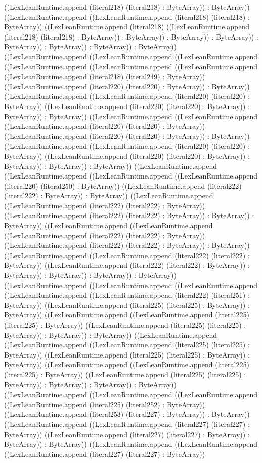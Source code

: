 \documentclass[11pt]{article}
\begin{document}
((LexLeanRuntime.append (literal218) (literal218) : ByteArray)) : ByteArray)) ((LexLeanRuntime.append ((LexLeanRuntime.append (literal218) (literal218) : ByteArray)) ((LexLeanRuntime.append (literal218) ((LexLeanRuntime.append (literal218) (literal218) : ByteArray)) : ByteArray)) : ByteArray)) : ByteArray)) : ByteArray)) : ByteArray)) : ByteArray)) : ByteArray)) ((LexLeanRuntime.append ((LexLeanRuntime.append ((LexLeanRuntime.append ((LexLeanRuntime.append ((LexLeanRuntime.append ((LexLeanRuntime.append ((LexLeanRuntime.append (literal218) (literal249) : ByteArray)) ((LexLeanRuntime.append (literal220) (literal220) : ByteArray)) : ByteArray)) ((LexLeanRuntime.append ((LexLeanRuntime.append (literal220) (literal220) : ByteArray)) ((LexLeanRuntime.append (literal220) (literal220) : ByteArray)) : ByteArray)) : ByteArray)) ((LexLeanRuntime.append ((LexLeanRuntime.append ((LexLeanRuntime.append (literal220) (literal220) : ByteArray)) ((LexLeanRuntime.append (literal220) (literal220) : ByteArray)) : ByteArray)) ((LexLeanRuntime.append ((LexLeanRuntime.append (literal220) (literal220) : ByteArray)) ((LexLeanRuntime.append (literal220) (literal220) : ByteArray)) : ByteArray)) : ByteArray)) : ByteArray)) ((LexLeanRuntime.append ((LexLeanRuntime.append ((LexLeanRuntime.append ((LexLeanRuntime.append (literal220) (literal250) : ByteArray)) ((LexLeanRuntime.append (literal222) (literal222) : ByteArray)) : ByteArray)) ((LexLeanRuntime.append ((LexLeanRuntime.append (literal222) (literal222) : ByteArray)) ((LexLeanRuntime.append (literal222) (literal222) : ByteArray)) : ByteArray)) : ByteArray)) ((LexLeanRuntime.append ((LexLeanRuntime.append ((LexLeanRuntime.append (literal222) (literal222) : ByteArray)) ((LexLeanRuntime.append (literal222) (literal222) : ByteArray)) : ByteArray)) ((LexLeanRuntime.append ((LexLeanRuntime.append (literal222) (literal222) : ByteArray)) ((LexLeanRuntime.append (literal222) (literal222) : ByteArray)) : ByteArray)) : ByteArray)) : ByteArray)) : ByteArray)) ((LexLeanRuntime.append ((LexLeanRuntime.append ((LexLeanRuntime.append ((LexLeanRuntime.append ((LexLeanRuntime.append (literal222) (literal251) : ByteArray)) ((LexLeanRuntime.append (literal225) (literal225) : ByteArray)) : ByteArray)) ((LexLeanRuntime.append ((LexLeanRuntime.append (literal225) (literal225) : ByteArray)) ((LexLeanRuntime.append (literal225) (literal225) : ByteArray)) : ByteArray)) : ByteArray)) ((LexLeanRuntime.append ((LexLeanRuntime.append ((LexLeanRuntime.append (literal225) (literal225) : ByteArray)) ((LexLeanRuntime.append (literal225) (literal225) : ByteArray)) : ByteArray)) ((LexLeanRuntime.append ((LexLeanRuntime.append (literal225) (literal225) : ByteArray)) ((LexLeanRuntime.append (literal225) (literal225) : ByteArray)) : ByteArray)) : ByteArray)) : ByteArray)) ((LexLeanRuntime.append ((LexLeanRuntime.append ((LexLeanRuntime.append ((LexLeanRuntime.append (literal225) (literal252) : ByteArray)) ((LexLeanRuntime.append (literal253) (literal227) : ByteArray)) : ByteArray)) ((LexLeanRuntime.append ((LexLeanRuntime.append (literal227) (literal227) : ByteArray)) ((LexLeanRuntime.append (literal227) (literal227) : ByteArray)) : ByteArray)) : ByteArray)) ((LexLeanRuntime.append ((LexLeanRuntime.append ((LexLeanRuntime.append (literal227) (literal227) : ByteArray)) 
\end{document}
